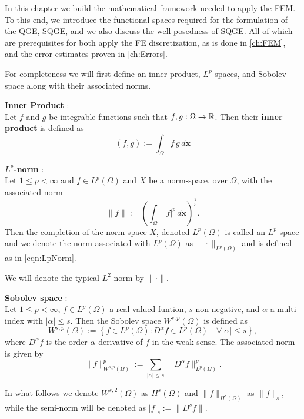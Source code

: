 In this chapter we build the mathematical framework needed to apply the FEM. To
this end, we introduce the functional spaces required for the formulation of the
QGE, SQGE, and we also discuss the well-posedness of SQGE. All of which are
prerequisites for both apply the FE discretization, as is done in
\autoref{ch:FEM}, and the error estimates proven in \autoref{ch:Errors}.

For completeness we will first define an inner product, $L^p$ spaces, and
Sobolev space along with their associated norms.

\begin{definition} \label{def:InnerProduct}
  \textbf{Inner Product} \cite{Kreyszig1989}: \\
  Let $f$ and $g$ be integrable functions such that $f,g : \Omega \rightarrow \mathbb{R}$.
  Then their \textbf{inner product} is defined as
  \begin{equation}
    (f,g) := \int_{\Omega}\! f \, g\, d\mathbf{x}
    \label{eqn:InnerProduct}
  \end{equation}
\end{definition}

\begin{definition} \label{def:LpNorm}
  \textbf{$L^p$-norm} \cite{Kreyszig1989}: \\
  Let $1\le p < \infty$ and $f \in L^p(\Omega)$ and $X$ be a norm-space, over
  $\Omega$, with the associated norm
  \begin{equation}
    \|f\| := \left(\int_{\Omega}\! |f|^p\, d\mathbf{x}\right)^{\frac{1}{p}}.
    \label{eqn:LpNorm}
  \end{equation}
  Then the completion of the norm-space $X$, denoted $L^p(\Omega)$ is called an
  $L^p$-space and we denote the norm associated with $L^p(\Omega)$ as
  $\|\cdot\|_{L^p(\Omega)}$ and is defined as in \eqref{eqn:LpNorm}.
\end{definition}
We will denote the typical $L^2$-norm by $\|\cdot\|$.

\begin{definition} \label{SobolevSpace}
  \textbf{Sobolev space} \cite{Evans1998}: \\
  Let $1\le p < \infty$, $f \in L^p(\Omega)$ a real valued funtion, $s$
  non-negative, and $\alpha$ a multi-index with $|\alpha| \le s$. Then the
  Sobolev space $W^{s,p}(\Omega)$ is defined as
  \begin{equation}
    W^{s,p}(\Omega) := \left\{ f\in L^p(\Omega) : D^{\alpha} f \in
      L^p(\Omega)\quad \forall |\alpha| \le s\right\},
    \label{eqn:Sobolev}
  \end{equation}
  where $D^{\alpha}f$ is the order $\alpha$ derivative of $f$ in the weak sense.
  The associated norm is given by
  \begin{equation}
    \|f\|_{W^{s,p}(\Omega)}^p := \sum_{|\alpha|\le s}
      \|D^{\alpha}f\|_{L^p(\Omega)}^p.
    \label{eqn:HkpNorm}
  \end{equation}
\end{definition}
In what follows we denote $W^{s,2}(\Omega)$ as $H^s(\Omega)$ and
$\|f\|_{H^s(\Omega)}$ as $\|f\|_s$, while the semi-norm will be denoted
as $|f|_s := \|D^s f\|$.

